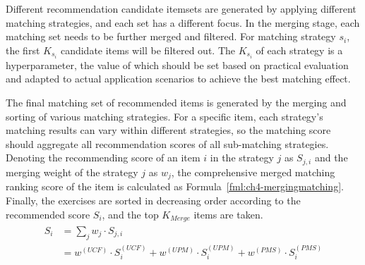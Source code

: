 
Different recommendation candidate itemsets are generated by applying different matching strategies, and each set has a different focus. In the merging stage, each matching set needs to be further merged and filtered. For matching strategy \(s_i\), the first \(K_{s_i}\) candidate items will be filtered out. The \(K_{s_i}\) of each strategy is a hyperparameter, the value of which should be set based on practical evaluation and adapted to actual application scenarios to achieve the best matching effect.

The final matching set of recommended items is generated by the merging and sorting of various matching strategies. For a specific item, each strategy's matching results can vary within different strategies, so the matching score should aggregate all recommendation scores of all sub-matching strategies.  Denoting the recommending score of an item \(i\) in the strategy \(j\) as \(S_{j, i}\) and the merging weight of the strategy \(j\) as \(w_j\), the comprehensive merged matching ranking score of the item is calculated as Formula~\ref{fml:ch4-mergingmatching}. Finally, the exercises are sorted in decreasing order according to the recommended score \(S_i\), and the top \(K_{Merge}\) items are taken.
\begin{align}\label{fml:ch4-mergingmatching}
  \begin{split}
    S_i & = \sum_{j}{w_j\cdot S_{j,i}}                                                       \\
    & = w^{(UCF)}\cdot S^{(UCF)}_i+w^{(UPM)}\cdot S^{(UPM)}_i+w^{(PMS)}\cdot S^{(PMS)}_i
  \end{split}
\end{align}


